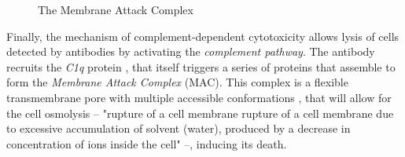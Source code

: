 \begin{figure}[H]
\begin{minipage}{0.49\textwidth}
        \caption{The Membrane Attack Complex}
        \label{fig:MAC}
    \end{minipage}
\end{figure}

Finally, the mechanism of complement-dependent cytotoxicity allows
lysis of cells detected by antibodies by activating the \emph{complement pathway}.
The antibody recruits the \emph{C1q} protein \cite{charles_a_janeway_complement_2001}
\cite{courtois_complement_2012}, that itself triggers a series
of proteins that assemble to form the \emph{Membrane Attack Complex} (MAC).
This complex is a flexible transmembrane pore with multiple 
accessible conformations \cite{xie_complement_2020},
that will allow for the cell osmolysis -- "rupture of a cell membrane rupture 
of a cell membrane due to excessive accumulation of solvent (water), produced by
a decrease in concentration of ions inside the cell" \cite{gebhart_osmolysis_2013} --,
inducing its death.


